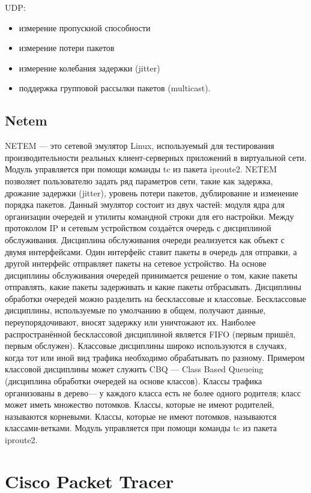 UDP:
\begin{itemize}
\item измерение пропускной способности
\item измерение потери пакетов
\item измерение колебания задержки (jitter)
\item поддержка групповой рассылки пакетов (multicast).
\end{itemize}

\subsection{Netem}

NETEM —  это сетевой эмулятор Linux, используемый для тестирования производительности реальных клиент-серверных приложений в виртуальной сети. 
Модуль управляется при помощи команды tc из пакета iproute2. 
NETEM позволяет пользователю задать ряд параметров сети, такие как задержка, дрожание задержки (jitter), уровень потери пакетов, дублирование и изменение
порядка пакетов. Данный эмулятор состоит из двух частей: модуля ядра для организации очередей и утилиты командной строки для его настройки. Между
протоколом IP и сетевым устройством создаётся очередь с дисциплиной обслуживания. Дисциплина обслуживания очереди реализуется как объект с двумя
интерфейсами. Один интерфейс ставит пакеты в очередь для отправки, а другой
интерфейс отправляет пакеты на сетевое устройство. На основе дисциплины
обслуживания очередей принимается решение о том, какие пакеты отправлять,
какие пакеты задерживать и какие пакеты отбрасывать.
Дисциплины обработки очередей можно разделить на бесклассовые и классовые. Бесклассовые дисциплины, используемые по умолчанию в общем, получают данные, переупорядочивают,
вносят задержку или уничтожают их. Наиболее распространённой бесклассовой дисциплиной является FIFO
(первым пришёл, первым обслужен).
Классовые дисциплины широко используются в случаях, когда тот или иной
вид трафика необходимо обрабатывать по разному. Примером классовой дисциплины может служить CBQ — Class Based Queueing (дисциплина обработки
очередей на основе классов). Классы трафика организованы в дерево— у каждого
класса есть не более одного родителя; класс может иметь множество потомков.
Классы, которые не имеют родителей, называются корневыми. Классы, которые
не имеют потомков, называются классами-ветками.
Модуль управляется при помощи команды tc из пакета iproute2. 



\section{Cisco Packet Tracer}

